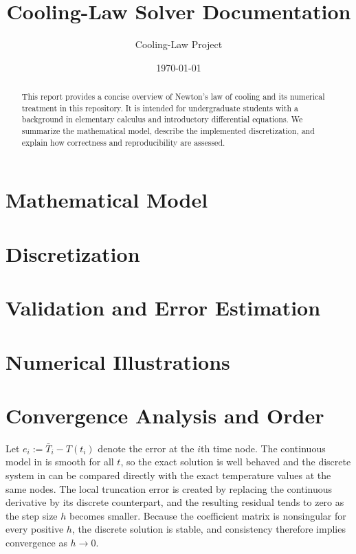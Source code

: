 \documentclass[11pt]{article}
\title{Cooling-Law Solver Documentation}
\author{Cooling-Law Project}
\date{\today}
\numberwithin{equation}{section}
\numberwithin{figure}{section}
\numberwithin{table}{section}
\begin{document}
\maketitle

\clearpage
\tableofcontents
\thispagestyle{empty}
\clearpage

\begin{abstract}
This report provides a concise overview of Newton's law of cooling and its
numerical treatment in this repository. It is intended for undergraduate
students with a background in elementary calculus and introductory differential
equations. We summarize the mathematical model, describe the implemented
discretization, and explain how correctness and reproducibility are assessed.
\end{abstract}

\section{Mathematical Model}
\label{sec:model}


\section{Discretization}
\label{sec:discretization}


\section{Validation and Error Estimation}
\label{sec:validation}


\section{Numerical Illustrations}
\label{sec:figures}


\section{Convergence Analysis and Order}
\label{sec:convergence}
Let $e_i := \bar{T}_i - T(t_i)$ denote the error at the $i$th time node. The
continuous model in  is smooth for all $t$, so the exact
solution is well behaved and the discrete system in 
can be compared directly with the exact temperature values at the same nodes.
The local truncation error is created by replacing the continuous derivative by
its discrete counterpart, and the resulting residual tends to zero as the step
size $h$ becomes smaller. Because the coefficient matrix is nonsingular for every
positive $h$, the discrete solution is stable, and consistency therefore implies
convergence as $h \to 0$.
\end{document}
